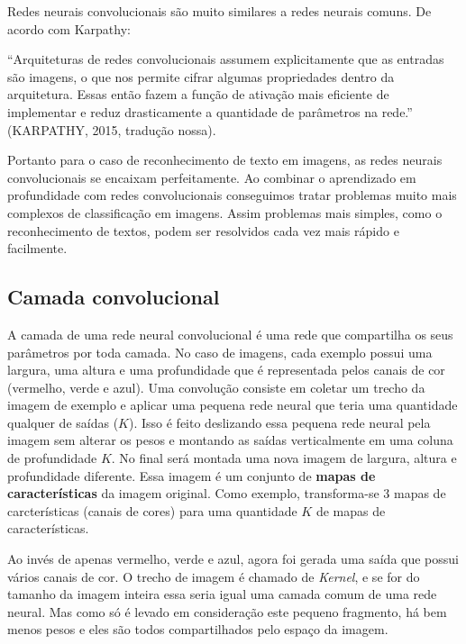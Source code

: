 Redes neurais convolucionais são muito similares a redes neurais
comuns. De acordo com Karpathy\cite{Karpathy}:
\begin{citacao}
  ``Arquiteturas de redes convolucionais assumem explicitamente que as
  entradas são imagens, o que nos permite cifrar algumas propriedades
  dentro da arquitetura. Essas então fazem a função de ativação mais
  eficiente de implementar e reduz drasticamente a quantidade de
  parâmetros na rede.'' (KARPATHY, 2015, tradução nossa).
\end{citacao}

Portanto para o caso de reconhecimento de texto em imagens, as redes
neurais convolucionais se encaixam perfeitamente. Ao combinar o
aprendizado em profundidade com redes convolucionais conseguimos
tratar problemas muito mais complexos de classificação em
imagens. Assim problemas mais simples, como o reconhecimento de
textos, podem ser resolvidos cada vez mais rápido e facilmente.

\subsection{Camada convolucional}

A camada de uma rede neural convolucional é uma rede que compartilha
os seus parâmetros por toda camada. No caso de imagens, cada exemplo
possui uma largura, uma altura e uma profundidade que é representada
pelos canais de cor (vermelho, verde e azul). Uma convolução consiste
em coletar um trecho da imagem de exemplo e aplicar uma pequena rede
neural que teria uma quantidade qualquer de saídas ($K$). Isso é feito
deslizando essa pequena rede neural pela imagem sem alterar os pesos e
montando as saídas verticalmente em uma coluna de profundidade $K$. No
final será montada uma nova imagem de largura, altura e profundidade
diferente. Essa imagem é um conjunto de {\bf mapas de características}
da imagem original. Como exemplo, transforma-se 3 mapas de
carcterísticas (canais de cores) para uma quantidade $K$ de mapas de
características.

Ao invés de apenas vermelho, verde e azul, agora foi gerada uma saída que
possui vários canais de cor. O trecho de imagem é chamado de
\textit{Kernel}, e se for do tamanho da imagem inteira essa seria
igual uma camada comum de uma rede neural. Mas como só é levado em
consideração este pequeno fragmento, há bem menos pesos e eles
são todos compartilhados pelo espaço da imagem.

